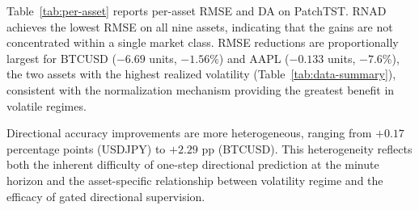\documentclass[11pt]{article}
\newcommand{\RNAD}{RNAD\xspace}
\begin{document}
Table~\ref{tab:per-asset} reports per-asset RMSE and DA on PatchTST.
\RNAD achieves the lowest RMSE on all nine assets, indicating that
the gains are not concentrated within a single market class. RMSE
reductions are proportionally largest for BTCUSD ($-6.69$ units,
$-1.56\%$) and AAPL ($-0.133$ units, $-7.6\%$), the two assets with
the highest realized volatility (Table~\ref{tab:data-summary}),
consistent with the normalization mechanism providing the greatest
benefit in volatile regimes.

Directional accuracy improvements are more heterogeneous, ranging from
$+0.17$ percentage points (USDJPY) to $+2.29$ pp (BTCUSD). This
heterogeneity reflects both the inherent difficulty of one-step
directional prediction at the minute horizon and the asset-specific
relationship between volatility regime and the efficacy of gated
directional supervision.
\end{document}
